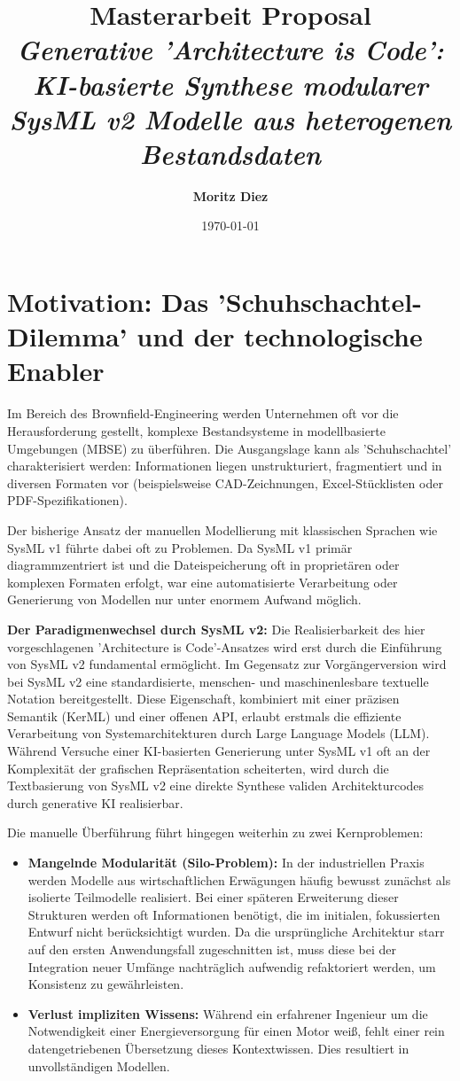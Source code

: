 \documentclass[12pt, a4paper]{article}
\title{\textbf{Masterarbeit Proposal} \\ \vspace{0.5cm} \large \textit{Generative 'Architecture is Code': KI-basierte Synthese modularer SysML v2 Modelle aus heterogenen Bestandsdaten}}
\author{\textbf{Moritz Diez}}
\date{\today}
\begin{document}
\maketitle

\section{Motivation: Das 'Schuhschachtel-Dilemma' und der technologische Enabler}

Im Bereich des Brownfield-Engineering werden Unternehmen oft vor die Herausforderung gestellt, komplexe Bestandsysteme in modellbasierte Umgebungen (MBSE) zu überführen. Die Ausgangslage kann als 'Schuhschachtel' charakterisiert werden: Informationen liegen unstrukturiert, fragmentiert und in diversen Formaten vor (beispielsweise CAD-Zeichnungen, Excel-Stücklisten oder PDF-Spezifikationen).

Der bisherige Ansatz der manuellen Modellierung mit klassischen Sprachen wie SysML v1 führte dabei oft zu Problemen. Da SysML v1 primär diagrammzentriert ist und die Dateispeicherung oft in proprietären oder komplexen Formaten erfolgt, war eine automatisierte Verarbeitung oder Generierung von Modellen nur unter enormem Aufwand möglich.

\textbf{Der Paradigmenwechsel durch SysML v2:}
Die Realisierbarkeit des hier vorgeschlagenen 'Architecture is Code'-Ansatzes wird erst durch die Einführung von SysML v2 fundamental ermöglicht. Im Gegensatz zur Vorgängerversion wird bei SysML v2 eine standardisierte, menschen- und maschinenlesbare textuelle Notation bereitgestellt. Diese Eigenschaft, kombiniert mit einer präzisen Semantik (KerML) und einer offenen API, erlaubt erstmals die effiziente Verarbeitung von Systemarchitekturen durch Large Language Models (LLM). Während Versuche einer KI-basierten Generierung unter SysML v1 oft an der Komplexität der grafischen Repräsentation scheiterten, wird durch die Textbasierung von SysML v2 eine direkte Synthese validen Architekturcodes durch generative KI realisierbar.

Die manuelle Überführung führt hingegen weiterhin zu zwei Kernproblemen:
\begin{itemize}
    \item \textbf{Mangelnde Modularität (Silo-Problem):} In der industriellen Praxis werden Modelle aus wirtschaftlichen Erwägungen häufig bewusst zunächst als isolierte Teilmodelle realisiert. Bei einer späteren Erweiterung dieser Strukturen werden oft Informationen benötigt, die im initialen, fokussierten Entwurf nicht berücksichtigt wurden. Da die ursprüngliche Architektur starr auf den ersten Anwendungsfall zugeschnitten ist, muss diese bei der Integration neuer Umfänge nachträglich aufwendig refaktoriert werden, um Konsistenz zu gewährleisten.
    \item \textbf{Verlust impliziten Wissens:} Während ein erfahrener Ingenieur um die Notwendigkeit einer Energieversorgung für einen Motor weiß, fehlt einer rein datengetriebenen Übersetzung dieses Kontextwissen. Dies resultiert in unvollständigen Modellen.
\end{itemize}
\end{document}
